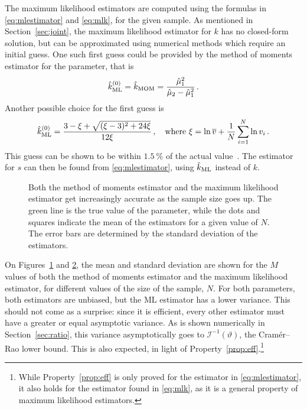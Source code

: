 \documentclass[final]{aomart}
\newtheorem[{}\it]{thm}{Theorem}[section]
\theoremstyle{definition}
\newtheorem*[{}\it]{notation}{Notation}
\numberwithin{equation}{section}
\renewcommand{\theta}{\vartheta}
\newcommand{\fisher}{\mathcal{I}} %
\begin{document}
The maximum likelihood estimators are computed using the formulas in \eqref{eq:mlestimator} and \eqref{eq:mlk}, for the given sample.
As mentioned in Section~\ref{sec:joint},
the maximum likelihood estimator for \(k\) has no closed-form solution,
but can be approximated using numerical methods which require an initial guess.
One such first guess could be provided by the method of moments estimator for the parameter,
that is
\begin{equation}
\hat{k}_{\textnormal{ML}}^{(0)} = \hat{k}_{\textnormal{MOM}} =  \frac{\hat{\mu}_1^2}{\hat{\mu}_2 - \hat{\mu}_1^2}\,.
\end{equation}
Another possible choice for the first guess is
\begin{equation}
\hat{k}_{\textnormal{ML}}^{(0)} = \frac{3 - \xi + \sqrt{(\xi - 3)^2 + 24\xi}}{12 \xi}\,, \quad \textnormal{where } \xi = \ln \overline{v} + \frac{1}{N} \sum_{i=1}^N \ln v_i\,.
\end{equation}
This guess can be shown to be within \(\SI{1.5}{\percent}\) of the actual value~\cite{minka:gamma}.
The estimator for \(s\) can then be found from \eqref{eq:mlestimator}, using \(\hat{k}_{\textnormal{ML}}\) instead of \(k\).
\begin{figure}[!htbp]
	\centering
	\begin{subfigure}{.5\textwidth}
		\centering
		\scalebox{0.75}{}
		\caption{}
		\label{fig:k_est}
	\end{subfigure}%
	\begin{subfigure}{.5\textwidth}
		\centering
		\scalebox{0.75}{}
		\caption{}
		\label{fig:s_est}
	\end{subfigure}
	\caption{Both the method of moments estimator and the maximum likelihood estimator get increasingly accurate as the sample size goes up.
	The green line is the true value of the parameter, while the dots and squares indicate the mean of the estimators for a given value of \(N\).
	The error bars are determined by the standard deviation of the estimators.}
	\label{fig:est}
\end{figure}

On Figures~\ref{fig:k_est} and \ref{fig:s_est}, the mean and standard deviation are shown for the \(M\) values of both the method of moments estimator and the maximum likelihood estimator, for different values of the size of the sample, \(N\).
For both parameters, both estimators are unbiased, but the ML estimator has a lower variance.
This should not come as a surprise: since it is efficient, every other estimator must have a greater or equal asymptotic variance.
As is shown numerically in Section~\ref{sec:ratio},
this variance asymptotically goes to \(\fisher^{-1}(\theta)\),
the Cramér--Rao lower bound.
This is also expected, in light of Property~\ref{prop:eff}.\footnote{While Property~\ref{prop:eff} is only proved for the estimator in \eqref{eq:mlestimator}, it also holds for the estimator found in \eqref{eq:mlk}, as it is a general property of maximum likelihood estimators.}
\end{document}
